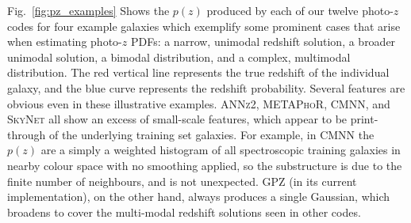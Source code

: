 Fig.~\ref{fig:pz_examples} Shows the $p(z)$ produced by each of our twelve photo-$z$ codes for four example galaxies which exemplify some prominent cases that arise when estimating photo-$z$ PDFs: a narrow, unimodal redshift solution, a broader unimodal solution, a bimodal distribution, and a complex, multimodal distribution.
The red vertical line represents the true redshift of the individual galaxy, and the blue curve represents the redshift probability.
Several features are obvious even in these illustrative examples.
\textsc{ANNz2, METAPhoR, CMNN,} and \textsc{SkyNet} all show an excess of small-scale features, which appear to be print-through of the underlying training set galaxies.  For example, in \textsc{CMNN} the $p(z)$ are a simply a weighted histogram of all spectroscopic training galaxies in nearby colour space with no smoothing applied, so the substructure is due to the finite number of neighbours, and is not unexpected.
\textsc{GPZ} (in its current implementation), on the other hand, always produces a single Gaussian, which broadens to cover the multi-modal redshift solutions seen in other codes.

